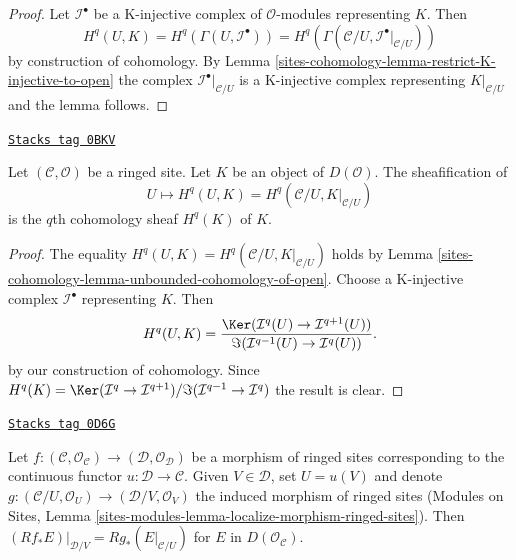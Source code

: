 \begin{proof}
Let $\mathcal{I}^\bullet$ be a K-injective complex of $\mathcal{O}$-modules
representing $K$. Then
$$
H^q(U, K) = H^q(\Gamma(U, \mathcal{I}^\bullet)) =
H^q(\Gamma(\mathcal{C}/U, \mathcal{I}^\bullet|_{\mathcal{C}/U}))
$$
by construction of cohomology. By
Lemma \ref{sites-cohomology-lemma-restrict-K-injective-to-open}
the complex $\mathcal{I}^\bullet|_{\mathcal{C}/U}$ is a K-injective complex
representing $K|_{\mathcal{C}/U}$ and the lemma follows.
\end{proof}

\begin{lemma}
\label{sites-cohomology-lemma-sheafification-cohomology}
\href{https://stacks.math.columbia.edu/tag/0BKV}{\texttt{Stacks tag 0BKV}}

Let $(\mathcal{C}, \mathcal{O})$ be a ringed site. Let $K$ be an object of
$D(\mathcal{O})$. The sheafification of
$$
U \mapsto H^q(U, K) = H^q(\mathcal{C}/U, K|_{\mathcal{C}/U})
$$
is the $q$th cohomology sheaf $H^q(K)$ of $K$.
\end{lemma}

\begin{proof}
The equality $H^q(U, K) = H^q(\mathcal{C}/U, K|_{\mathcal{C}/U})$
holds by Lemma \ref{sites-cohomology-lemma-unbounded-cohomology-of-open}.
Choose a K-injective complex $\mathcal{I}^\bullet$ representing $K$.
Then
$$
H^q(U, K) =
\frac{\Ker(\mathcal{I}^q(U) \to \mathcal{I}^{q + 1}(U))}
{\Im(\mathcal{I}^{q - 1}(U) \to \mathcal{I}^q(U))}.
$$
by our construction of cohomology. Since
$H^q(K) = \Ker(\mathcal{I}^q \to \mathcal{I}^{q + 1})/
\Im(\mathcal{I}^{q - 1} \to \mathcal{I}^q)$ the result is clear.
\end{proof}

\begin{lemma}
\label{sites-cohomology-lemma-restrict-direct-image-open}
\href{https://stacks.math.columbia.edu/tag/0D6G}{\texttt{Stacks tag 0D6G}}

Let $f : (\mathcal{C}, \mathcal{O}_\mathcal{C}) \to
(\mathcal{D}, \mathcal{O}_\mathcal{D})$ be a morphism of ringed sites
corresponding to the continuous functor $u : \mathcal{D} \to \mathcal{C}$.
Given $V \in \mathcal{D}$, set $U = u(V)$ and denote
$g : (\mathcal{C}/U, \mathcal{O}_U) \to (\mathcal{D}/V, \mathcal{O}_V)$
the induced morphism of ringed sites
(Modules on Sites, Lemma
\ref{sites-modules-lemma-localize-morphism-ringed-sites}).
Then $(Rf_*E)|_{\mathcal{D}/V} = Rg_*(E|_{\mathcal{C}/U})$
for $E$ in $D(\mathcal{O}_\mathcal{C})$.
\end{lemma}

